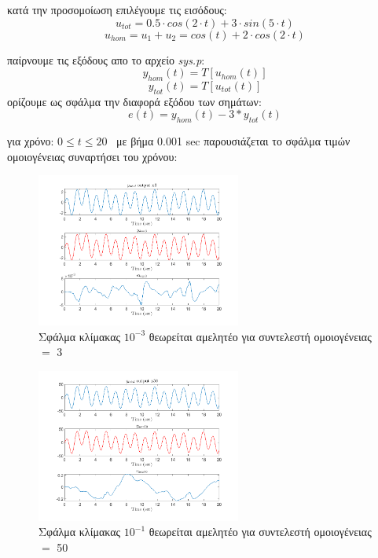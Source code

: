 \documentclass{article}
\begin{document}
\begin{itemize}
    κατά την προσομοίωση επιλέγουμε τις εισόδους: 
    \begin{equation*}
    \boxed{
    u_{tot} =  0.5 \cdot cos(2 \cdot t) + 3 \cdot sin(5 \cdot t)
    }
    \end{equation*}
    \begin{equation*}
    \boxed{
    u_{hom} = u_1 + u_2 = cos(t) + 2 \cdot cos(2 \cdot t)
    }
    \end{equation*}  

    παίρνουμε τις εξόδους απο το αρχείο \textit{sys.p}:
    \begin{equation*}
    \boxed{
    y_{hom}(t) = T\left[u_{hom}(t)\right]
    }
    \end{equation*}
    \begin{equation*}
    \boxed{
    y_{tot}(t) = T\left[u_{tot}(t)\right]
    }
    \end{equation*}
    ορίζουμε ως σφάλμα την διαφορά εξόδου των σημάτων:
    \begin{equation*}
    e(t) = y_{hom}(t) - 3 * y_{tot}(t)
    \end{equation*}

    για χρόνο:  $ 0 \leq t \leq 20 \enspace$   με βήμα 0.001 sec παρουσιάζεται το σφάλμα τιμών ομοιογένειας συναρτήσει του χρόνου: 
    
    \begin{figure}[!htb]
    \centering
    \includegraphics[width=0.6\textwidth]{linear_2nd_crit_1.png}
    \caption{\label{fig:lin2_1}Σφάλμα κλίμακας $10^{-3}$ θεωρείται αμελητέο για συντελεστή ομοιογένειας $=$ 3}
    \end{figure}

    \begin{figure}[!htb]
    \centering
    \includegraphics[width=0.6\textwidth]{linear_2nd_crit_2.png}
    \caption{\label{fig:lin2_2}Σφάλμα κλίμακας $10^{-1}$ θεωρείται αμελητέο για συντελεστή ομοιογένειας $=$ 50}
    \end{figure}


\end{itemize}
\end{document}
